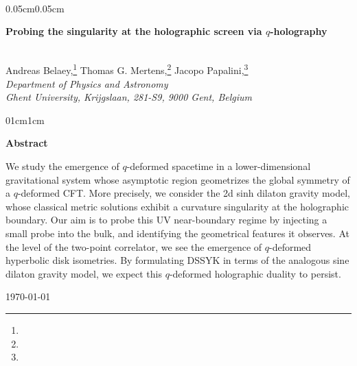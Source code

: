 \documentclass[a4paper,titlepage,12pt]{article}
\date{June 2024}
\numberwithin{equation}{section}
\begin{document}
\begin{titlepage}

\setcounter{page}{1} \baselineskip=15.5pt \thispagestyle{empty}


\vfil


${}$
\vspace{1cm}

\begin{center}

\def\thefootnote{\fnsymbol{footnote}}
\begin{changemargin}{0.05cm}{0.05cm} 

\begin{center}

{\Large \bf Probing the singularity at the holographic screen via $q$-holography} \\

\end{center}
\end{changemargin}


~\\[1cm]
{Andreas Belaey,\footnote{{\protect{}}} Thomas G. Mertens,\footnote{{\protect{}}} Jacopo Papalini,\footnote{{\protect{}}}}
\\[0.3cm]
{\normalsize { \sl Department of Physics and Astronomy
\\[1.0mm]
Ghent University, Krijgslaan, 281-S9, 9000 Gent, Belgium}}\\[3mm]


\end{center}

 \vspace{0.2cm}
\begin{changemargin}{01cm}{1cm} 
{\small  \noindent 
\begin{center} 
\textbf{Abstract}
\end{center} 
We study the emergence of $q$-deformed spacetime in a lower-dimensional gravitational system whose asymptotic region geometrizes the global symmetry of a $q$-deformed CFT. More precisely, we consider the 2d sinh dilaton gravity model, whose classical metric solutions exhibit a curvature singularity at the holographic boundary. Our aim is to probe this UV near-boundary regime by injecting a small probe into the bulk, and identifying the geometrical features it observes. At the level of the two-point correlator, we see the emergence of $q$-deformed hyperbolic disk isometries. By formulating DSSYK in terms of the analogous sine dilaton gravity model, we expect this $q$-deformed holographic duality to persist.
}
\end{changemargin}
 \vspace{0.3cm}
\vfil
\begin{flushleft}
\today
\end{flushleft}

\end{titlepage}
\end{document}
